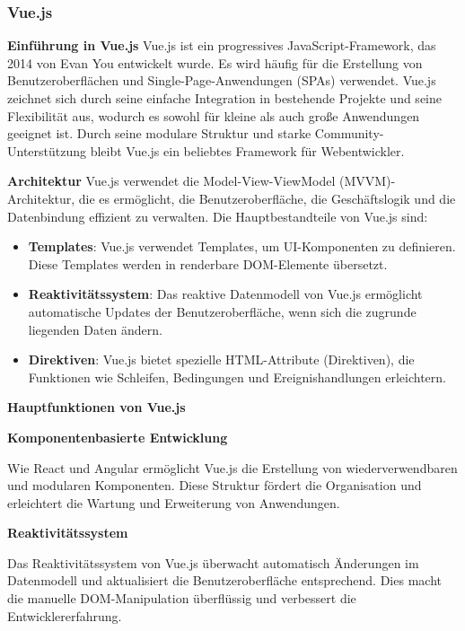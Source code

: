 \subsubsection{Vue.js}

\textbf{Einführung in Vue.js}
\newline
Vue.js ist ein progressives JavaScript-Framework, das 2014 von Evan You entwickelt wurde. Es wird häufig für die Erstellung von Benutzeroberflächen und Single-Page-Anwendungen (SPAs) verwendet. Vue.js zeichnet sich durch seine einfache Integration in bestehende Projekte und seine Flexibilität aus, wodurch es sowohl für kleine als auch große Anwendungen geeignet ist. Durch seine modulare Struktur und starke Community-Unterstützung bleibt Vue.js ein beliebtes Framework für Webentwickler.\textit{\cite{rathinam2022analysis, madurapperuma2022state, vuejs}} \newline

\textbf{Architektur}
\newline
Vue.js verwendet die Model-View-ViewModel (MVVM)-Architektur, die es ermöglicht, die Benutzeroberfläche, die Geschäftslogik und die Datenbindung effizient zu verwalten. Die Hauptbestandteile von Vue.js sind:

\begin{itemize}
	\item \textbf{Templates}: Vue.js verwendet Templates, um UI-Komponenten zu definieren. Diese Templates werden in renderbare DOM-Elemente übersetzt.
	\item \textbf{Reaktivitätssystem}: Das reaktive Datenmodell von Vue.js ermöglicht automatische Updates der Benutzeroberfläche, wenn sich die zugrunde liegenden Daten ändern.
	\item \textbf{Direktiven}: Vue.js bietet spezielle HTML-Attribute (Direktiven), die Funktionen wie Schleifen, Bedingungen und Ereignishandlungen erleichtern.\textit{\cite{hutagikar2020analysis, vuejs}}
\end{itemize}

\textbf{Hauptfunktionen von Vue.js}

\textbf{Komponentenbasierte Entwicklung} 

Wie React und Angular ermöglicht Vue.js die Erstellung von wiederverwendbaren und modularen Komponenten. Diese Struktur fördert die Organisation und erleichtert die Wartung und Erweiterung von Anwendungen.\textit{\cite{rathinam2022analysis, vuejs}}

\textbf{Reaktivitätssystem} 

Das Reaktivitätssystem von Vue.js überwacht automatisch Änderungen im Datenmodell und aktualisiert die Benutzeroberfläche entsprechend. Dies macht die manuelle DOM-Manipulation überflüssig und verbessert die Entwicklererfahrung.\textit{\cite{hutagikar2020analysis, vue_blog}}

